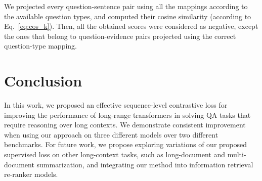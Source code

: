 \documentclass[11pt,a4paper]{article}
\begin{document}
We projected every question-sentence pair using all the mappings according to the available question types, and computed their cosine similarity (according to Eq.~\ref{eq:cos_k}). Then, all the obtained scores were considered as negative, except the ones that belong to question-evidence pairs projected using the correct question-type mapping. %




\section{Conclusion}
In this work, we proposed an effective sequence-level contrastive loss for improving the performance of long-range transformers in solving QA tasks that require reasoning over long contexts. We demonstrate consistent improvement when using our approach on three different models over two different benchmarks.
For future work, we propose exploring variations of our proposed supervised loss on other long-context tasks, such as long-document and multi-document summarization, and integrating our method into information retrieval re-ranker models.







\clearpage
\appendix

\end{document}
